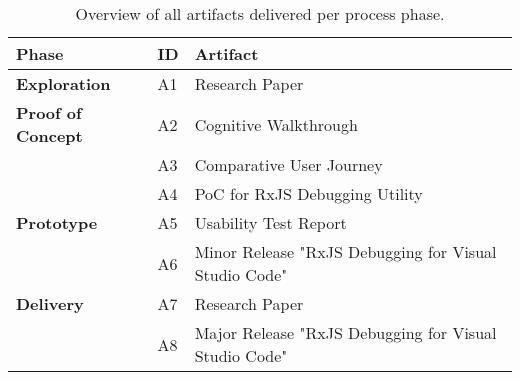 
\begin{table}[h]
  \label{tbl:artifact-overview}
  \caption{Overview of all artifacts delivered per process phase.}

  \newcommand\Tstrut{\rule{0pt}{2.6ex}}       %
  \newcommand\Bstrut{\rule[-0.9ex]{0pt}{0pt}} %
  \newcommand{\TBstrut}{\Tstrut\Bstrut} %

  \begin{tabular}{llp{7.37cm}}
    \textbf{Phase}                             & \textbf{ID} & \textbf{Artifact}                                     \TBstrut \\
    \hline
    \textbf{Exploration}                       & A1 & Research Paper                                        \TBstrut \\
    \hline
    \textbf{Proof of Concept} & A2 & Cognitive Walkthrough                                 \TBstrut \\
                                              & A3 & Comparative User Journey                              \Bstrut  \\
                                              & A4 & PoC for RxJS Debugging Utility                        \Bstrut \\
    \hline
    \textbf{Prototype}        & A5 & Usability Test Report                                \TBstrut  \\
                                              & A6 & Minor Release "RxJS Debugging for Visual Studio Code" \Bstrut \\
    \hline
    \textbf{Delivery}         & A7 & Research Paper                                       \TBstrut  \\
                                              & A8 & Major Release "RxJS Debugging for Visual Studio Code" \Bstrut \\
    \hline
  \end{tabular}
\end{table}
